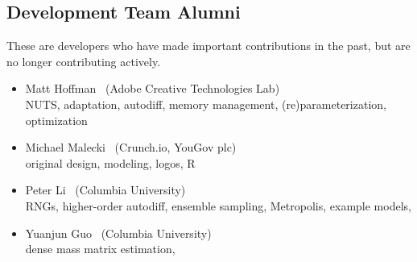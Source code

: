 \subsection*{Development Team Alumni}

These are developers who have made important contributions in the
past, but are no longer contributing actively.

\begin{itemize}
\item Matt Hoffman \ (Adobe Creative Technologies Lab)
\\ {\footnotesize NUTS, adaptation, autodiff, memory management,
  (re)parameterization, optimization \Cpp}
\item Michael Malecki \ (Crunch.io, YouGov plc)
\\ {\footnotesize original design, modeling, logos, R}
\item Peter Li \   (Columbia University)
\\ {\footnotesize RNGs, higher-order autodiff, ensemble sampling,
  Metropolis, example models, \Cpp}
\item Yuanjun Guo \ (Columbia University)
\\ {\footnotesize dense mass matrix estimation, \Cpp}
\end{itemize}

